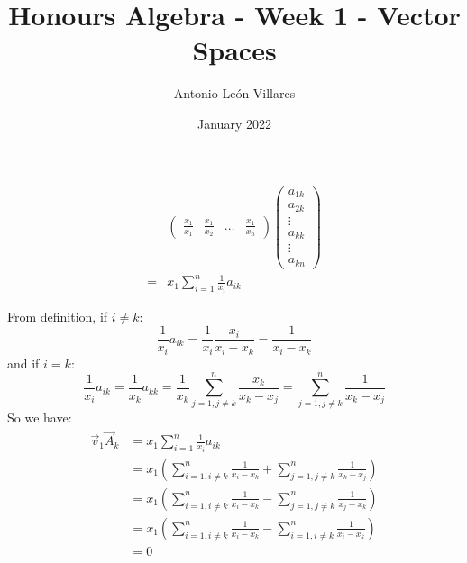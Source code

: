 \documentclass{exam}
\title{Honours Algebra - Week 1 - Vector Spaces}
\author{Antonio León Villares}
\date{January 2022}
\begin{document}
\maketitle

\tableofcontents

\pagebreak

\begin{align*}
   &\begin{pmatrix}\frac{x_1}{x_1} & \frac{x_1}{x_2} & \ldots & \frac{x_1}{x_n} \end{pmatrix} 
   \begin{pmatrix}
   a_{1k} \\
   a_{2k} \\
   \vdots \\
   a_{kk} \\
   \vdots \\
   a_{kn}
   \end{pmatrix}
   \\
   =& x_1 \sum_{i = 1}^n \frac{1}{x_i}a_{ik}
\end{align*}

From definition, if $i \neq k$:
\[
\frac{1}{x_i}a_{ik} = \frac{1}{x_i}\frac{x_i}{x_i - x_k} = \frac{1}{x_i - x_k}
\]
and if $i = k$:
\[
\frac{1}{x_i}a_{ik} = \frac{1}{x_k}a_{kk} = \frac{1}{x_k}\sum_{j = 1, j \neq k}^n\frac{x_k}{x_k - x_j} = \sum_{j = 1, j \neq k}^n\frac{1}{x_k - x_j}
\]
So we have:
\begin{align*}
    \vec{v}_1\vec{A}_k &= x_1 \sum_{i = 1}^n \frac{1}{x_i}a_{ik} \\
                       &= x_1 \left(\sum_{i = 1, i \neq k}^n \frac{1}{x_i - x_k} + \sum_{j = 1, j \neq k}^n\frac{1}{x_k - x_j}\right) \\
                       &= x_1 \left(\sum_{i = 1, i \neq k}^n \frac{1}{x_i - x_k} - \sum_{j = 1, j \neq k}^n\frac{1}{x_j - x_k}\right) \\
                       &= x_1 \left(\sum_{i = 1, i \neq k}^n \frac{1}{x_i - x_k} - \sum_{i = 1, i \neq k}^n\frac{1}{x_i - x_k}\right) \\
                       &= 0
\end{align*}
\end{document}
